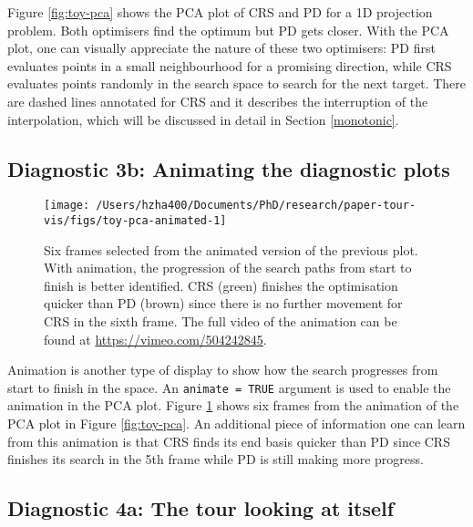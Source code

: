 Figure \ref{fig:toy-pca} shows the PCA plot of CRS and PD for a 1D
projection problem. Both optimisers find the optimum but PD gets closer.
With the PCA plot, one can visually appreciate the nature of these two
optimisers: PD first evaluates points in a small neighbourhood for a
promising direction, while CRS evaluates points randomly in the search
space to search for the next target. There are dashed lines annotated
for CRS and it describes the interruption of the interpolation, which
will be discussed in detail in Section \ref{monotonic}.

\hypertarget{diagnostic-3b-animating-the-diagnostic-plots}{%
\subsection{Diagnostic 3b: Animating the diagnostic
plots}\label{diagnostic-3b-animating-the-diagnostic-plots}}

\begin{Schunk}
\begin{figure}

{\centering \texttt{[image: /Users/hzha400/Documents/PhD/research/paper-tour-vis/figs/toy-pca-animated-1]} 

}

\caption{Six frames selected from the animated version of the previous plot. With animation, the progression of the search paths from start to finish is better identified. CRS (green) finishes the optimisation quicker than PD (brown) since there is no further movement for CRS in the sixth frame. The full video of the animation can be found at \url{https://vimeo.com/504242845}.}\label{fig:toy-pca-animated}
\end{figure}
\end{Schunk}

Animation is another type of display to show how the search progresses
from start to finish in the space. An \texttt{animate\ =\ TRUE} argument
is used to enable the animation in the PCA plot. Figure
\ref{fig:toy-pca-animated} shows six frames from the animation of the
PCA plot in Figure \ref{fig:toy-pca}. An additional piece of information
one can learn from this animation is that CRS finds its end basis
quicker than PD since CRS finishes its search in the 5th frame while PD
is still making more progress.

\hypertarget{diagnostic-4a-the-tour-looking-at-itself}{%
\subsection{Diagnostic 4a: The tour looking at
itself}\label{diagnostic-4a-the-tour-looking-at-itself}}

